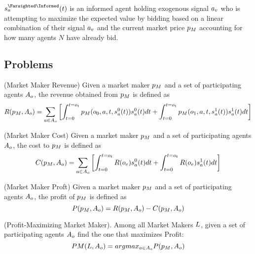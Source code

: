 $\AgentStrategy^{\Farsighted\Informed}_\Agent(\Time)$ is an informed agent holding exogenous signal $a_v$ who is attempting to maximize the expected value by bidding based on a linear combination of their signal $a_v$ and the current market price $p_M$ accounting for how many agents $N$ have already bid. \\

\subsection{Problems}
  
  \begin{definition} (Market Maker Revenue)
  \label{def:mmr}
   Given a market maker $p_M$ and a set of participating agents
   $A_o$, the revenue obtained from $p_M$ is defined as
     $$R(p_M, A_o) = 
      \sum_{a\in A_o} \left[
	\int_{t = 0}^{t = o_t} 
	  p_M(o_0,a,t, s^{0}_{a}(t))s^{0}_{a}(t)dt
	  + \int_{t = 0}^{t = o_t} 
	  p_M(o_1,a,t, s^{1}_{a}(t))s^{1}_{a}(t)dt\right]$$
  \end{definition}
  
    \begin{definition} (Market Maker Cost)
  \label{def:mmc}
   Given a market maker $p_M$ and a set of participating agents
   $A_o$, the cost to $p_M$ is defined as
     $$ C(p_M, A_o) =
     \sum_{a\in A_o} \left[
	\int_{t = 0}^{t = o_t} 
	R(o_e)s^{0}_{a}(t)dt
	+\int_{t = 0}^{t = o_t} 
	R(o_e)s^{1}_{a}(t)dt
	\right]$$
  \end{definition}

      \begin{definition} (Market Maker Proft)
  \label{def:mmf}
   Given a market maker $p_M$ and a set of participating agents
   $A_o$, the profit of $p_M$ is defined as
     $$ P(p_M, A_o) = R(p_M, A_o) 
     - C(p_M, A_o)$$
  \end{definition}
  
\begin{definition} (Profit-Maximizing Market Maker).
\label{def:pmmm}
Among all Market Makers $L$, given a set of participating agents $A_o$ find the one that maximizes Profit:
$$ PM(L, A_o) = arg max_{a \in A_o} P(p_M, A_o)$$
\end{definition}


